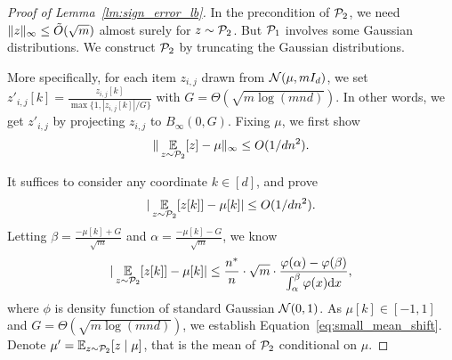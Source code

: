 \begin{proof}[Proof of Lemma~\ref{lm:sign_error_lb}]
In the precondition of $\mathcal{P}_2$, we need $\|z\|_\infty\le \Tilde{O}(\sqrt{m})$ almost surely for $z\sim\mathcal{P}_2$.
But $\mathcal{P}_1$ involves some Gaussian distributions.
We construct $\mathcal{P}_2$ by truncating the Gaussian distributions.

More specifically, for each item $z_{i,j}$ drawn from $\mathcal{N}(\mu,m I_d)$, we set $z'_{i,j}[k]=\frac{z_{i,j}[k]}{\max\{1,|z_{i,j}[k]|/G \}}$ with $G=\Theta(\sqrt{m\log(mnd)})$.
In other words, we get $z'_{i,j}$ by projecting $z_{i,j}$ to $B_\infty(0,G)$.
Fixing $\mu$, we first show  
\begin{align}
\label{eq:small_mean_shift}
    \|\operatorname*{\mathbb{E}}_{z\sim\mathcal{P}_2}[z]-\mu\|_\infty\le O(1/dn^2).
\end{align}

It suffices to consider any coordinate $k\in[d]$, and prove
\begin{align*}
    |\operatorname*{\mathbb{E}}_{z\sim\mathcal{P}_2}[z[k]]-\mu[k]|\le O(1/dn^2).
\end{align*}
Letting $\beta=\frac{-\mu[k]+G}{\sqrt{m}}$ and $\alpha=\frac{-\mu[k]-G}{\sqrt{m}}$, we know
\begin{align*}
   |\operatorname*{\mathbb{E}}_{z\sim\mathcal{P}_2}[z[k]]-\mu[k]|\le \frac{n^*}{n}\cdot \sqrt{m} \cdot \frac{\varphi(\alpha)-\varphi(\beta)}{\int_{\alpha}^{\beta}\varphi(x) \mathrm{d} x},
\end{align*}
where $\phi$ is density function of standard Gaussian $\mathcal{N}(0,1)$.
As $\mu[k]\in[-1,1]$ and $G=\Theta(\sqrt{m\log(mnd)})$, we establish Equation~\eqref{eq:small_mean_shift}.
Denote $\mu'=\operatorname*{\mathbb{E}}_{z\sim\mathcal{P}_2}[z\mid \mu]$, that is the mean of $\mathcal{P}_2$ conditional on $\mu$.


\end{proof}
